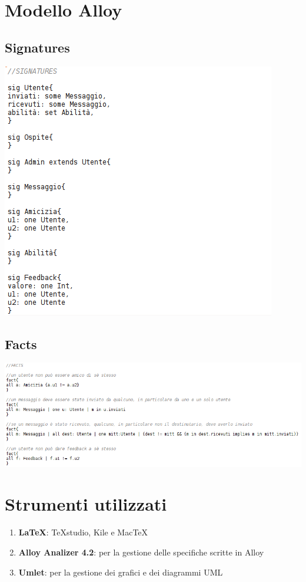 \documentclass[a4paper,12pt]{article}
\begin{document}
\section{Modello Alloy}
\subsection{Signatures}
\includegraphics[scale=0.75]{signatures.png}
\subsection{Facts}
\includegraphics[scale=0.75]{facts.png} \\
\clearpage
\section{Strumenti utilizzati}
\begin{enumerate}
\itemsep0em
\item \textbf{\LaTeX}: TeXstudio, Kile e MacTeX
\item \textbf{Alloy Analizer 4.2}: per la gestione delle specifiche scritte in Alloy
\item \textbf{Umlet}: per la gestione dei grafici e dei diagrammi UML
\end{enumerate}
\end{document}
